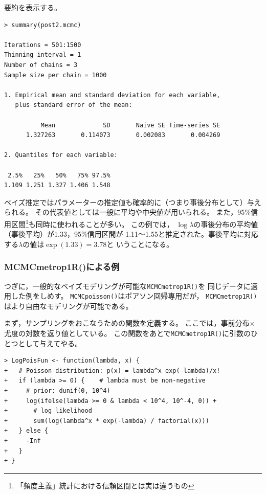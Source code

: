 \documentclass[11pt,uplatex]{jsarticle}
\begin{document}
要約を表示する。
\begin{lstlisting}
> summary(post2.mcmc)

Iterations = 501:1500
Thinning interval = 1 
Number of chains = 3 
Sample size per chain = 1000 

1. Empirical mean and standard deviation for each variable,
   plus standard error of the mean:

          Mean             SD       Naive SE Time-series SE 
      1.327263       0.114073       0.002083       0.004269 

2. Quantiles for each variable:

 2.5%   25%   50%   75% 97.5% 
1.109 1.251 1.327 1.406 1.548 

\end{lstlisting}
%
ベイズ推定ではパラメーターの推定値も確率的に（つまり事後分布として）与えられる。
その代表値としては一般に平均や中央値が用いられる。
また，95\%信用区間\footnote{「頻度主義」統計における信頼区間とは実は違うもの}も同時に使われることが多い。
この例では，
$\log\lambda$の事後分布の平均値（事後平均）が1.33，95\%信用区間が
1.11〜1.55と推定された。事後平均に対応する$\lambda$の値は$\exp(1.33)=3.78$と
いうことになる。

\subsubsection{MCMCmetrop1R()による例}

つぎに，一般的なベイズモデリングが可能な\texttt{MCMCmetrop1R()}を
同じデータに適用した例をしめす。
\texttt{MCMCpoisson()}はポアソン回帰専用だが，
\texttt{MCMCmetrop1R()}はより自由なモデリングが可能である。

まず，サンプリングをおこなうための関数を定義する。
ここでは，事前分布$\times$尤度の対数を返り値としている。
この関数をあとで\texttt{MCMCmetrop1R()}に引数のひとつとして与えてやる。
\begin{lstlisting}
> LogPoisFun <- function(lambda, x) {
+   # Poisson distribution: p(x) = lambda^x exp(-lambda)/x!
+   if (lambda >= 0) {    # lambda must be non-negative
+     # prior: dunif(0, 10^4)
+     log(ifelse(lambda >= 0 & lambda < 10^4, 10^-4, 0)) + 
+       # log likelihood
+       sum(log(lambda^x * exp(-lambda) / factorial(x)))
+   } else {
+     -Inf
+   }
+ }
\end{lstlisting}
\end{document}
